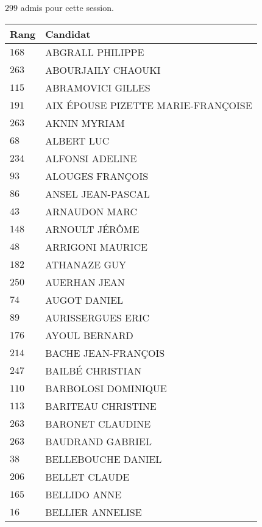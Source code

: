 




  $299$ admis pour cette session.

  \begin{xltabular}{\linewidth}{|l|X|}
    \hline
    \textbf{Rang} & \textbf{Candidat} \\
    \hline
    $168$ & ABGRALL PHILIPPE \\
    \hline
    $263$ & ABOURJAILY CHAOUKI \\
    \hline
    $115$ & ABRAMOVICI GILLES \\
    \hline
    $191$ & AIX ÉPOUSE PIZETTE MARIE-FRANÇOISE \\
    \hline
    $263$ & AKNIN MYRIAM \\
    \hline
    $68$ & ALBERT LUC \\
    \hline
    $234$ & ALFONSI ADELINE \\
    \hline
    $93$ & ALOUGES FRANÇOIS \\
    \hline
    $86$ & ANSEL JEAN-PASCAL \\
    \hline
    $43$ & ARNAUDON MARC \\
    \hline
    $148$ & ARNOULT JÉRÔME \\
    \hline
    $48$ & ARRIGONI MAURICE \\
    \hline
    $182$ & ATHANAZE GUY \\
    \hline
    $250$ & AUERHAN JEAN \\
    \hline
    $74$ & AUGOT DANIEL \\
    \hline
    $89$ & AURISSERGUES ERIC \\
    \hline
    $176$ & AYOUL BERNARD \\
    \hline
    $214$ & BACHE JEAN-FRANÇOIS \\
    \hline
    $247$ & BAILBÉ CHRISTIAN \\
    \hline
    $110$ & BARBOLOSI DOMINIQUE \\
    \hline
    $113$ & BARITEAU CHRISTINE \\
    \hline
    $263$ & BARONET CLAUDINE \\
    \hline
    $263$ & BAUDRAND GABRIEL \\
    \hline
    $38$ & BELLEBOUCHE DANIEL \\
    \hline
    $206$ & BELLET CLAUDE \\
    \hline
    $165$ & BELLIDO ANNE \\
    \hline
    $16$ & BELLIER ANNELISE \\

\end{xltabular}
